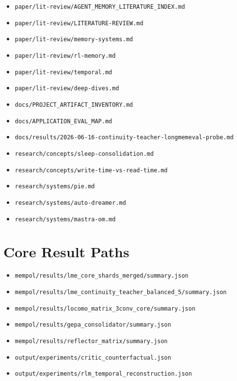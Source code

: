 \documentclass[11pt]{article}
\begin{document}
\begin{itemize}
  \item \texttt{paper/lit-review/AGENT\_MEMORY\_LITERATURE\_INDEX.md}
  \item \texttt{paper/lit-review/LITERATURE-REVIEW.md}
  \item \texttt{paper/lit-review/memory-systems.md}
  \item \texttt{paper/lit-review/rl-memory.md}
  \item \texttt{paper/lit-review/temporal.md}
  \item \texttt{paper/lit-review/deep-dives.md}
  \item \texttt{docs/PROJECT\_ARTIFACT\_INVENTORY.md}
  \item \texttt{docs/APPLICATION\_EVAL\_MAP.md}
  \item \texttt{docs/results/2026-06-16-continuity-teacher-longmemeval-probe.md}
  \item \texttt{research/concepts/sleep-consolidation.md}
  \item \texttt{research/concepts/write-time-vs-read-time.md}
  \item \texttt{research/systems/pie.md}
  \item \texttt{research/systems/auto-dreamer.md}
  \item \texttt{research/systems/mastra-om.md}
\end{itemize}

\section{Core Result Paths}

\begin{itemize}
  \item \texttt{mempol/results/lme\_core\_shards\_merged/summary.json}
  \item \texttt{mempol/results/lme\_continuity\_teacher\_balanced\_5/summary.json}
  \item \texttt{mempol/results/locomo\_matrix\_3conv\_core/summary.json}
  \item \texttt{mempol/results/gepa\_consolidator/summary.json}
  \item \texttt{mempol/results/reflector\_matrix/summary.json}
  \item \texttt{output/experiments/critic\_counterfactual.json}
  \item \texttt{output/experiments/rlm\_temporal\_reconstruction.json}
\end{itemize}
\end{document}
